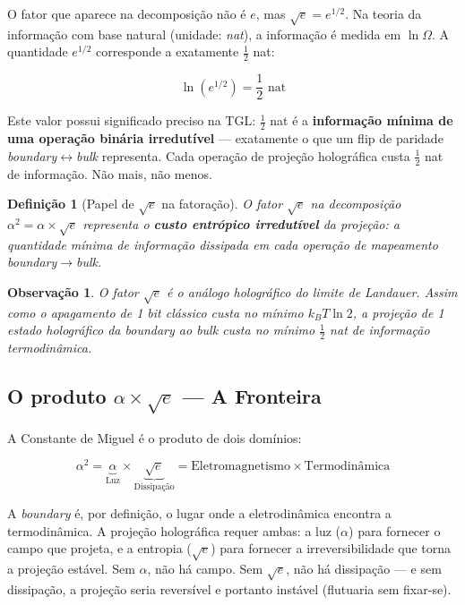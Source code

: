 \documentclass[12pt,a4paper,twoside]{article}
\newtheorem{definition}[theorem]{Definição}
\newtheorem{remark}[theorem]{Observação}
\newcommand{\alphaii}{\alpha^{2}}
\newcommand{\boundary}{\textit{boundary}}
\newcommand{\bulk}{\textit{bulk}}
\begin{document}
O fator que aparece na decomposição não é $e$, mas $\sqrt{e} = e^{1/2}$. Na teoria da informação com base natural (unidade: \textit{nat}), a informação é medida em $\ln \Omega$. A quantidade $e^{1/2}$ corresponde a exatamente $\frac{1}{2}$ nat:

\begin{equation}
\ln(e^{1/2}) = \frac{1}{2} \text{ nat}
\end{equation}

Este valor possui significado preciso na TGL: $\frac{1}{2}$ nat é a \textbf{informação mínima de uma operação binária irredutível} --- exatamente o que um flip de paridade \boundary$\leftrightarrow$\bulk{} representa. Cada operação de projeção holográfica custa $\frac{1}{2}$ nat de informação. Não mais, não menos.

\begin{definition}[Papel de $\sqrt{e}$ na fatoração]
O fator $\sqrt{e}$ na decomposição $\alphaii = \alpha \times \sqrt{e}$ representa o \textbf{custo entrópico irredutível} da projeção: a quantidade mínima de informação dissipada em cada operação de mapeamento \boundary$\to$\bulk.
\end{definition}

\begin{remark}
O fator $\sqrt{e}$ é o análogo holográfico do limite de Landauer. Assim como o apagamento de 1 bit clássico custa no mínimo $k_B T \ln 2$, a projeção de 1 estado holográfico da \boundary{} ao \bulk{} custa no mínimo $\frac{1}{2}$ nat de informação termodinâmica.
\end{remark}


\subsection{O produto $\alpha \times \sqrt{e}$ --- A Fronteira}

A Constante de Miguel é o produto de dois domínios:

\begin{factorbox}[title={Síntese}]
\begin{equation}
\alphaii = \underbrace{\alpha}_{\text{Luz}} \times \underbrace{\sqrt{e}}_{\text{Dissipação}} = \text{Eletromagnetismo} \times \text{Termodinâmica}
\label{eq:sintese}
\end{equation}
\end{factorbox}

\noindent A \boundary{} é, por definição, o lugar onde a eletrodinâmica encontra a termodinâmica. A projeção holográfica requer ambas: a luz ($\alpha$) para fornecer o campo que projeta, e a entropia ($\sqrt{e}$) para fornecer a irreversibilidade que torna a projeção estável. Sem $\alpha$, não há campo. Sem $\sqrt{e}$, não há dissipação --- e sem dissipação, a projeção seria reversível e portanto instável (flutuaria sem fixar-se).
\end{document}
